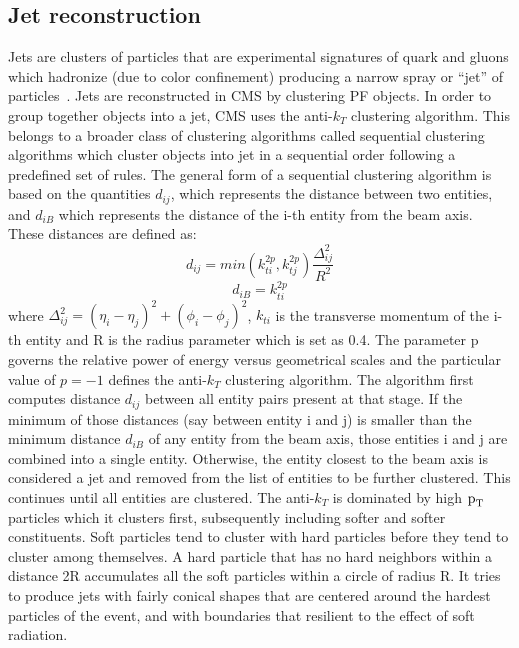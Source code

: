 \subsection{Jet reconstruction}
\label{jet_recon}
Jets are clusters of particles that are experimental signatures of quark and gluons which hadronize (due to color confinement) producing a narrow spray or ``jet'' of particles~\cite{jet_recon}. Jets are reconstructed in CMS by clustering PF objects. In order to group together objects into a jet, CMS uses the anti-$k_{T}$ clustering algorithm. This belongs to a broader class of clustering algorithms called sequential clustering algorithms which cluster objects into jet in a sequential order following a predefined set of rules. The general form of a sequential clustering algorithm is based on the quantities  $d_{ij}$, which represents the distance between two entities, and $d_{iB}$ which represents the distance of the i-th entity from the beam axis. These distances are defined as:
\begin{equation}
  d_{ij}=min(k_{ti}^{2p},k_{tj}^{2p})\frac{\Delta_{ij}^{2}}{R^2}
\end{equation}
\begin{equation}
  d_{iB}=k_{ti}^{2p}
\end{equation}
where $\Delta_{ij}^{2}=(\eta_i-\eta_j)^2+(\phi_i-\phi_j)^2$, $k_{ti}$ is the transverse momentum of the i-th entity and R is the radius parameter which is set as 0.4. The parameter p governs the relative power of energy versus geometrical scales and the particular value of $p=-1$ defines the anti-$k_{T}$ clustering algorithm. The algorithm first computes distance $d_{ij}$ between all entity pairs present at that stage. If the minimum of those distances (say between entity i and j) is smaller than the minimum distance $d_{iB}$ of any entity from the beam axis, those entities i and j are combined into a single entity. Otherwise, the entity closest to the beam axis is considered a jet and removed from the list of entities to be further clustered. This continues until all entities are clustered. The anti-$k_{T}$ is dominated by high $\text{p}_\text{T}$ particles which it clusters first, subsequently including softer and softer constituents. Soft particles tend to cluster with hard particles before they tend to cluster among themselves. A hard particle that has no hard neighbors within a distance 2R accumulates all the soft particles within a circle of radius R. It tries to produce jets with fairly conical shapes that are centered around the hardest particles of the event, and with boundaries that resilient to the effect of soft radiation.

